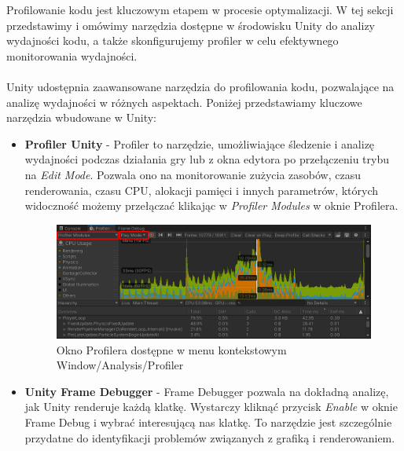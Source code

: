 Profilowanie kodu jest kluczowym etapem w procesie optymalizacji. W tej sekcji przedstawimy i omówimy narzędzia dostępne w środowisku Unity do analizy wydajności kodu, a także skonfigurujemy profiler w celu efektywnego monitorowania wydajności. \\ \\
Unity udostępnia zaawansowane narzędzia do profilowania kodu, pozwalające na analizę wydajności w różnych aspektach. Poniżej przedstawiamy kluczowe narzędzia wbudowane w Unity:

\begin{itemize}
    \item \textbf{Profiler Unity} - Profiler to narzędzie, umożliwiające śledzenie i analizę wydajności podczas działania gry lub z okna edytora po przełączeniu trybu na \textit{Edit Mode}. Pozwala ono na monitorowanie zużycia zasobów, czasu renderowania, czasu CPU, alokacji pamięci i innych parametrów, których widoczność możemy przełączać klikając w \textit{Profiler Modules} w oknie Profilera.
    \begin{figure}[h]
        \centering
        \includegraphics[width=1\linewidth]{Images/unityProfiler.png}
        \caption{Okno Profilera dostępne w menu kontekstowym Window/Analysis/Profiler}
    \end{figure}
    \item \textbf{Unity Frame Debugger} - Frame Debugger pozwala na dokładną analizę, jak Unity renderuje każdą klatkę. Wystarczy kliknąć przycisk \textit{Enable} w oknie Frame Debug i wybrać interesującą nas klatkę. To narzędzie jest szczególnie przydatne do identyfikacji problemów związanych z grafiką i renderowaniem.
    \begin{figure}[h]
        \centering

\end{figure}
\end{itemize}
